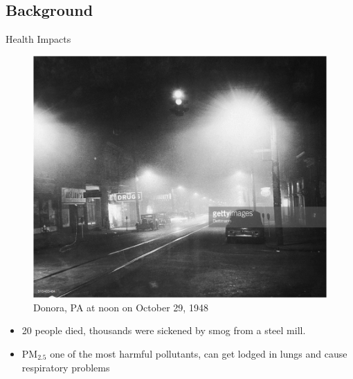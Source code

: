\documentclass[notheorems,envcountsect,allowframebreaks,xcolor=svgnames,8pt]{beamer}
\begin{document}
\subsection*{Background}



\begin{frame}{Health Impacts}
\begin{figure}[H]
\centering
\includegraphics[scale=0.3]{19481029pm.png}
\caption{Donora, PA at noon on October 29, 1948}
\label{fig:locations}
\end{figure}

\begin{itemize}
\item 20 people died, thousands were sickened by smog from a steel mill.
\item PM$_{2.5}$ one of the most harmful pollutants, can get lodged in lungs and cause respiratory problems
\end{itemize}
\end{frame}
\end{document}
